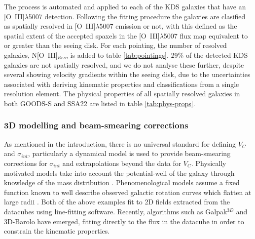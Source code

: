 \documentclass[fleqn,usenatbib]{mn2e}
\begin{document}
The process is automated and applied to each of the KDS galaxies that have an [O~{\sc III}]$\lambda$5007 detection.
Following the fitting procedure the galaxies are clasified as spatially resolved in [O~{\sc III}]$\lambda$5007 emission or not, with this defined as  the spatial extent of the accepted spaxels in the [O~{\sc III}]$\lambda$5007 flux map equivalent to or greater than the seeing disk.
For each pointing, the number of resolved galaxies, N[O~{\sc III}]$_{Res}$, is added to table \ref{tab:pointings}.
29\% of the detected KDS galaxies are not spatially resolved, and we do not analyse these further, despite several showing velocity gradients within the seeing disk, due to the uncertainties associated with deriving kinematic properties and classifications from a single resolution element.
The physical properties of all spatially resolved galaxies in both GOODS-S and SSA22 are listed in table \ref{tab:phys-props}.

\subsubsection{3D modelling and beam-smearing corrections}\label{subsec:3d_modelling}

As mentioned in the introduction, there is no universal standard for defining $V_{C}$ and $\sigma_{int}$, particularly a dynamical model is used to provide beam-smearing corrections for $\sigma_{int}$ and extrapolations beyond the data for $V_{C}$.
Physically motivated models take into account the potential-well of the galaxy through knowledge of the mass distribution \citep[e.g.][]{Genzel2008,ForsterSchreiber2009,Gnerucci2011,Wisnioski2015}.
Phenomenological models assume a fixed function known to well describe observed galactic rotation curves which flatten at large radii \citep[e.g.][]{Epinat2010,Epinat2012,Swinbank2012,Stott2016,Harrison2017}.
Both of the above examples fit to 2D fields extracted from the datacubes using line-fitting software.
Recently, algorithms such as Galpak$^{3D}$ \citep{Bouche2015} and 3D-Barolo \citep{DiTeodoro2015} have emerged, fitting directly to the flux in the datacube in order to constrain the kinematic properties.
\end{document}
